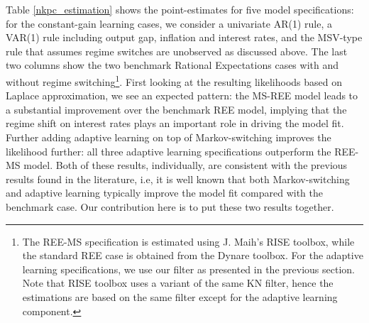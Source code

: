 \documentclass[12pt,reqno]{article}
\numberwithin{equation}{section}
\begin{document}
Table \ref{nkpc_estimation} shows the point-estimates for five model specifications: for the constant-gain learning cases, we consider a univariate AR(1) rule, a VAR(1) rule including output gap, inflation and interest rates, and the MSV-type rule that assumes regime switches are unobserved as discussed above. The last two columns show the two benchmark Rational Expectations cases with and without regime switching\footnote{The REE-MS specification is estimated using J. Maih's RISE toolbox, while the standard REE case is obtained from the Dynare toolbox. For the adaptive learning specifications, we use our filter as presented in the previous section. Note that RISE toolbox uses a variant of the same KN filter, hence the estimations are based on the same filter except for the adaptive learning component.}. First looking at the resulting likelihoods based on Laplace approximation, we see an expected pattern: the MS-REE model leads to a substantial improvement over the benchmark REE model, implying that the regime shift on interest rates plays an important role in driving the model fit. Further adding adaptive learning on top of Markov-switching improves the likelihood further: all three adaptive learning specifications outperform the REE-MS model. Both of these results, individually, are consistent with the previous results found in the literature, i.e, it is well known that both Markov-switching and adaptive learning typically improve the model fit compared with the benchmark case. Our contribution here is to put these two results together.\\
\noindent
\end{document}
